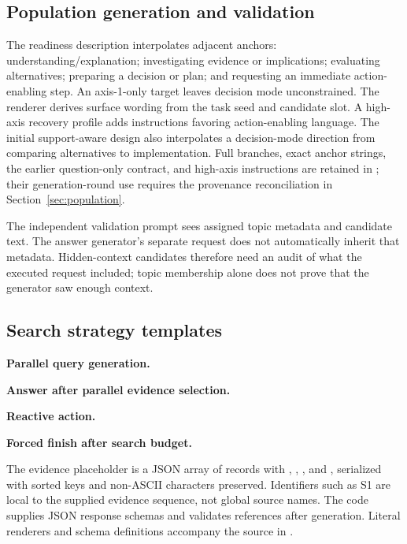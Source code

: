 \subsection{Population generation and validation}

The readiness description interpolates adjacent anchors: understanding/explanation; investigating evidence or implications; evaluating alternatives; preparing a decision or plan; and requesting an immediate action-enabling step. An axis-1-only target leaves decision mode unconstrained. The renderer derives surface wording from the task seed and candidate slot. A high-axis recovery profile adds instructions favoring action-enabling language. The initial support-aware design also interpolates a decision-mode direction from comparing alternatives to implementation. Full branches, exact anchor strings, the earlier question-only contract, and high-axis instructions are retained in ; their generation-round use requires the provenance reconciliation in Section~\ref{sec:population}.

The independent validation prompt sees assigned topic metadata and candidate text. The answer generator's separate request does not automatically inherit that metadata. Hidden-context candidates therefore need an audit of what the executed request included; topic membership alone does not prove that the generator saw enough context.

\clearpage
\subsection{Search strategy templates}
\medskip\noindent\textbf{Parallel query generation.}\par\smallskip

\medskip\noindent\textbf{Answer after parallel evidence selection.}\par\smallskip

\medskip\noindent\textbf{Reactive action.}\par\smallskip

\medskip\noindent\textbf{Forced finish after search budget.}\par\smallskip

The evidence placeholder is a JSON array of records with , , , and , serialized with sorted keys and non-ASCII characters preserved. Identifiers such as S1 are local to the supplied evidence sequence, not global source names. The code supplies JSON response schemas and validates references after generation. Literal renderers and schema definitions accompany the source in .

